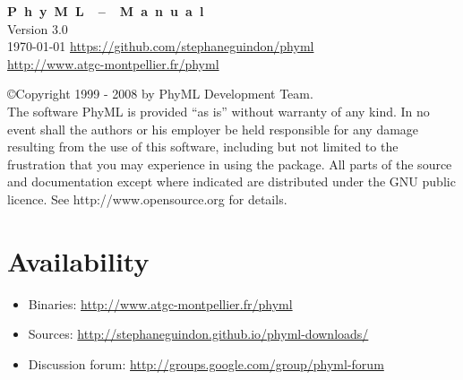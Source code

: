 \documentclass[a4paper,12pt]{article}
\begin{document}
\sloppy
\begin{center}
\thispagestyle{empty}
\vfill\vfill
{\Huge \textbf{ P~h~y~M~L~~--~~M~a~n~u~a~l}}
\vspace{-0.4cm}\\
\vfill
{\huge Version 3.0 \\
\today
\vfill
\normalsize
\href{https://github.com/stephaneguindon/phyml}{https://github.com/stephaneguindon/phyml}\\
\vspace{0.4cm}
\href{http://www.atgc-montpellier.fr/phyml}{http://www.atgc-montpellier.fr/phyml}}
\end{center}
\clearpage
\tableofcontents
\clearpage

{\par
\small
\noindent
\copyright Copyright 1999 - 2008 by PhyML Development Team.\\
\noindent The software PhyML is provided ``as is''  without warranty of any kind.  In no event shall
the authors  or his  employer be  held responsible  for any damage  resulting from  the use  of this
software, including but not limited to the frustration that you may experience in using the package.
All parts of the source and documentation except where indicated are distributed under
the GNU public licence. See http://www.opensource.org for details.

}

{
\noindent
\setlength{\baselineskip}{0.5\baselineskip}
\section{Availability}
\begin{itemize}
\item Binaries: \href{http://www.atgc-montpellier.fr/phyml}{http://www.atgc-montpellier.fr/phyml}
\item Sources: \href{http://stephaneguindon.github.io/phyml-downloads/}{http://stephaneguindon.github.io/phyml-downloads/}
\item Discussion forum: \href{http://groups.google.com/group/phyml-forum}{http://groups.google.com/group/phyml-forum}
\end{itemize}
}
\end{document}
